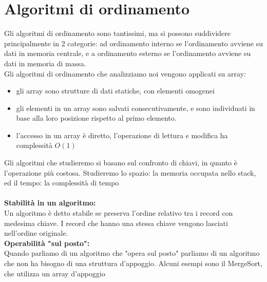 \documentclass[11pt, oneside]{article}   	%
\begin{document}
\section{Algoritmi di ordinamento}
Gli algoritmi di ordinamento sono tantissimi, ma si possono suddividere principalmente in 2 categorie: ad ordinamento interno se l'ordinamento avviene su dati in memoria centrale, e a ordinamento esterno se l'ordinamento avviene su dati in memoria di massa.\\
Gli algoritmi di ordinamento che analizziamo noi vengono applicati su array:
\begin{itemize}
\item gli array sono strutture di dati statiche, con elementi omogenei
\item gli elementi in un array sono salvati consecutivamente, e sono individuati in base alla loro posizione rispetto al primo elemento.
\item l'accesso in un array è diretto, l'operazione di lettura e modifica ha complessità $O(1)$
\end{itemize}
Gli algoritmi che studieremo si basano sul confronto di chiavi, in quanto è l'operazione più costosa. Studieremo lo spazio: la memoria occupata nello stack, ed il tempo: la complessità di tempo\\\\
\textbf{Stabilità in un algoritmo:}\\
Un algoritmo è detto stabile se preserva l'ordine relativo tra i record con medesima chiave. I record che hanno una stessa chiave vengono lasciati nell'ordine originale.\\
\textbf{Operabilità "sul posto":}\\
Quando parliamo di un algoritmo che "opera sul posto" parliamo di un algoritmo che non ha bisogno di una struttura d'appoggio. Alcuni esempi sono il MergeSort, che utilizza un array d'appoggio
\end{document}
